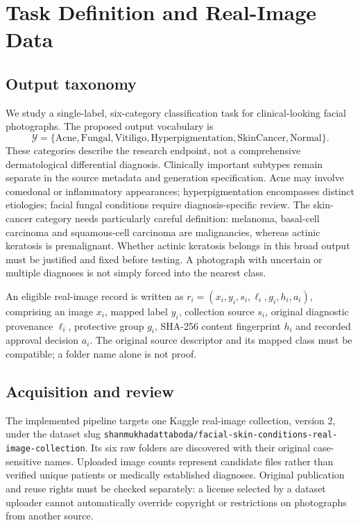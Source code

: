 \section{Task Definition and Real-Image Data}
\subsection{Output taxonomy}
We study a single-label, six-category classification task for clinical-looking facial photographs. The proposed output vocabulary is
\begin{equation}
\mathcal{Y}=\{\mathrm{Acne},\mathrm{Fungal},\mathrm{Vitiligo},
\mathrm{Hyperpigmentation},\mathrm{SkinCancer},\mathrm{Normal}\}.
\label{eq:labels}
\end{equation}
These categories describe the research endpoint, not a comprehensive dermatological differential diagnosis. Clinically important subtypes remain separate in the source metadata and generation specification. Acne may involve comedonal or inflammatory appearances; hyperpigmentation encompasses distinct etiologies; facial fungal conditions require diagnosis-specific review. The skin-cancer category needs particularly careful definition: melanoma, basal-cell carcinoma and squamous-cell carcinoma are malignancies, whereas actinic keratosis is premalignant. Whether actinic keratosis belongs in this broad output must be justified and fixed before testing. A photograph with uncertain or multiple diagnoses is not simply forced into the nearest class.

An eligible real-image record is written as $r_i=(x_i,y_i,s_i,\ell_i,g_i,h_i,a_i)$, comprising an image $x_i$, mapped label $y_i$, collection source $s_i$, original diagnostic provenance $\ell_i$, protective group $g_i$, SHA-256 content fingerprint $h_i$ and recorded approval decision $a_i$. The original source descriptor and its mapped class must be compatible; a folder name alone is not proof.

\subsection{Acquisition and review}
The implemented pipeline targets one Kaggle real-image collection, version 2, under the dataset slug \texttt{shanmukhadattaboda/facial-skin-conditions-real-image-collection}. Its six raw folders are discovered with their original case-sensitive names. Uploaded image counts represent candidate files rather than verified unique patients or medically established diagnoses. Original publication and reuse rights must be checked separately: a license selected by a dataset uploader cannot automatically override copyright or restrictions on photographs from another source.

